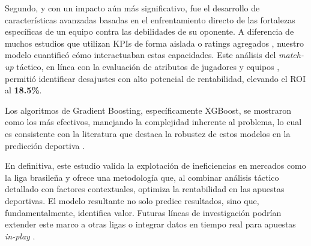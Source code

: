 Segundo, y con un impacto aún más significativo, fue el desarrollo de características avanzadas basadas en el enfrentamiento directo de las fortalezas específicas de un equipo contra las debilidades de su oponente. A diferencia de muchos estudios que utilizan KPIs de forma aislada \cite{liPassingWinUsing2021} o ratings agregados \cite{angeliniWeightedEloRating2022}, nuestro modelo cuantificó cómo interactuaban estas capacidades. Este análisis del \textit{match-up} táctico, en línea con la evaluación de atributos de jugadores y equipos \cite{yeungFrameworkInterpretableMatch2023, oluwayomiEvaluationTeamsFalse2022}, permitió identificar desajustes con alto potencial de rentabilidad, elevando el ROI al \textbf{18.5\%}.

Los algoritmos de Gradient Boosting, específicamente XGBoost, se mostraron como los más efectivos, manejando la complejidad inherente al problema, lo cual es consistente con la literatura que destaca la robustez de estos modelos en la predicción deportiva \cite{Malamatinos2022GreekLeague, Tammouch2024BettingML}.


En definitiva, este estudio valida la explotación de ineficiencias en mercados como la liga brasileña \cite{Beretta2023OptimalAlgorithmTournaments} y ofrece una metodología que, al combinar análisis táctico detallado con factores contextuales, optimiza la rentabilidad en las apuestas deportivas. El modelo resultante no solo predice resultados, sino que, fundamentalmente, identifica valor. Futuras líneas de investigación podrían extender este marco a otras ligas o integrar datos en tiempo real para apuestas \textit{in-play} \cite{Zou2020BayesianInPlay}.
